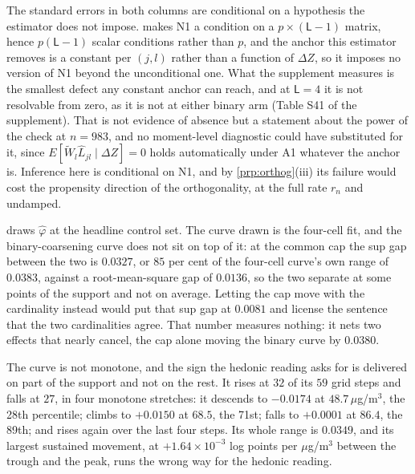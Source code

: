 \documentclass[
  12pt]{article}
\newcommand{\1}[1]{\mathds{1}\left[#1\right]}
\theoremstyle{plain}
\theoremstyle{definition}
\theoremstyle{definition}
\theoremstyle{remark}
\begin{document}
The standard errors in both columns are conditional on a hypothesis the
estimator does not impose.  makes N1 a condition on
a \(p\times(\mathsf L-1)\) matrix, hence \(p(\mathsf L-1)\) scalar
conditions rather than \(p\), and the anchor this estimator removes is a
constant per \((j,l)\) rather than a function of \(\Delta Z\), so it
imposes no version of N1 beyond the unconditional one. What the
supplement measures is the smallest defect any constant anchor can
reach, and at \(\mathsf L=4\) it is not resolvable from zero, as it is
not at either binary arm (Table S41 of the supplement). That is not
evidence of absence but a statement about the power of the check at
\(n=983\), and no moment-level diagnostic could have substituted for it,
since \(E[\widetilde W_l\hat L_{jl}\mid\Delta Z]=0\) holds automatically
under A1 whatever the anchor is. Inference here is conditional on N1,
and by \cref{prp:orthog}(iii) its failure would cost the propensity
direction of the orthogonality, at the full rate \(r_n\) and undamped.

 draws \(\hat\varphi\) at the headline control set.
The curve drawn is the four-cell fit, and the binary-coarsening curve
does not sit on top of it: at the common cap the sup gap between the two
is \(0.0327\), or \(85\) per cent of the four-cell curve's own range of
\(0.0383\), against a root-mean-square gap of \(0.0136\), so the two
separate at some points of the support and not on average. Letting the
cap move with the cardinality instead would put that sup gap at
\(0.0081\) and license the sentence that the two cardinalities agree.
That number measures nothing: it nets two effects that nearly cancel,
the cap alone moving the binary curve by \(0.0380\).

The curve is not monotone, and the sign the hedonic reading asks for is
delivered on part of the support and not on the rest. It rises at \(32\)
of its \(59\) grid steps and falls at \(27\), in four monotone
stretches: it descends to \(-0.0174\) at \(48.7\,\mu\)g/m\(^3\), the
28th percentile; climbs to \(+0.0150\) at \(68.5\), the 71st; falls to
\(+0.0001\) at \(86.4\), the 89th; and rises again over the last four
steps. Its whole range is \(0.0349\), and its largest sustained
movement, at \(+1.64\times10^{-3}\) log points per \(\mu\)g/m\(^3\)
between the trough and the peak, runs the wrong way for the hedonic
reading.
\end{document}
